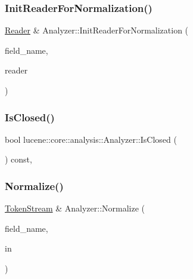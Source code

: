 \subsubsection{\texorpdfstring{Init\+Reader\+For\+Normalization()}{InitReaderForNormalization()}}
{\footnotesize\ttfamily \mbox{\hyperlink{classlucene_1_1core_1_1analysis_1_1Reader}{Reader}} \& Analyzer\+::\+Init\+Reader\+For\+Normalization (\begin{DoxyParamCaption}\item[{const std\+::string \&}]{field\+\_\+name,  }\item[{\mbox{\hyperlink{classlucene_1_1core_1_1analysis_1_1Reader}{Reader}} \&}]{reader }\end{DoxyParamCaption})\hspace{0.3cm}{\ttfamily [protected]}}

\mbox{\label{classlucene_1_1core_1_1analysis_1_1Analyzer_a3a533567be4805332be57160b0364b79}} 
\subsubsection{\texorpdfstring{Is\+Closed()}{IsClosed()}}
{\footnotesize\ttfamily bool lucene\+::core\+::analysis\+::\+Analyzer\+::\+Is\+Closed (\begin{DoxyParamCaption}{ }\end{DoxyParamCaption}) const\hspace{0.3cm}{\ttfamily [inline]}, {\ttfamily [noexcept]}}

\mbox{\label{classlucene_1_1core_1_1analysis_1_1Analyzer_a9c76b9071c95ee8347b0f8ae2a208e6e}} 
\subsubsection{\texorpdfstring{Normalize()}{Normalize()}\hspace{0.1cm}{\footnotesize\ttfamily [1/2]}}
{\footnotesize\ttfamily \mbox{\hyperlink{classlucene_1_1core_1_1analysis_1_1TokenStream}{Token\+Stream}} \& Analyzer\+::\+Normalize (\begin{DoxyParamCaption}\item[{const std\+::string \&}]{field\+\_\+name,  }\item[{\mbox{\hyperlink{classlucene_1_1core_1_1analysis_1_1TokenStream}{Token\+Stream}} \&}]{in }\end{DoxyParamCaption})\hspace{0.3cm}{\ttfamily [protected]}}

